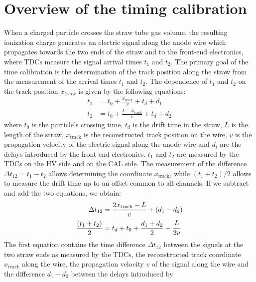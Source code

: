 \section{Overview of the timing calibration}
When a charged particle crosses the straw tube 
gas volume, the resulting ionization charge 
generates an electric signal along the anode  
wire which propagates towards the two ends of 
the straw and to the front-end electronics, 
where TDCs measure the signal arrival 
times $t_1$ and $t_2$. The primary goal of 
the time calibration is  the 
determination of the track position 
along the straw from the measurement of 
the arrival times $t_1$ and $t_2$. 
The dependence of $t_1$ and $t_2$ on the track 
position $x_{track}$ is given by the following equations:
\begin{equation}
\begin{aligned}
    t_1 &= t_0 + \frac{x_{\text{track}}}{v} + t_d + d_1 \\
    t_2 &= t_0 + \frac{L - x_{\text{track}}}{v} + t_d + d_2
\end{aligned}
\end{equation}
where $t_0$ is the particle's crossing time, 
$t_d$ is the drift time in the straw, 
$L$ is the length of the straw, 
$x_{\text{track}}$ is the 
reconstructed track position on the wire, $v$ 
is the propagation velocity of 
the electric signal along the anode 
wire and $d_i$ are the delays  
introduced by the front end electronics. 
$t_1$ and $t_2$ are measured  
by the TDCs on the HV side and on the CAL side.
The measurement of the difference 
$\Delta t_{12}=t_1-t_2$ allows 
determining the coordinate $x_{\text{track}}$, 
while $(t_1 + t_2) / 2$ allows to measure the drift time  
up to an offset common to all channels. 
If we subtract and add the two equations, we obtain:
\begin{equation}\label{ffffff}
    \begin{aligned}
        \Delta t_{12} &= \frac{2x_{\text{track}}-L}{v} +(d_1-d_2)  \\
        \frac{(t_1 + t_2)}{2} &= t_d+t_0+\frac{d_1+d_2}{2}-\cfrac{L}{2v} 
    \end{aligned}
    \end{equation}
The first equation contains the time 
difference $\Delta t_{12}$ between the 
signals at the two straw ends as measured 
by the TDCs, the reconstructed track coordinate 
$x_{track}$ along the wire, the propagation  
velocity $v$ of the signal along the wire and 
the difference $d_1-d_2$ between the delays introduced by 
